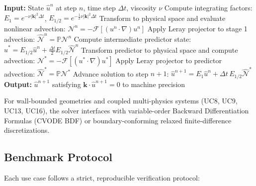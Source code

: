 \begin{algorithm}[H]
\caption{LeanFlow Lawson Integrating Factor RK2 (IF-RK2) Solenoidal Time-Step}
\label{alg:leanflow}
\begin{algorithmic}[1]
\State \textbf{Input:} State $\hat{u}^n$ at step $n$, time step $\Delta t$, viscosity $\nu$
\State Compute integrating factors: $E_1 = e^{-\nu |\mathbf{k}|^2 \Delta t}$, $E_{1/2} = e^{-\frac{1}{2}\nu |\mathbf{k}|^2 \Delta t}$
\State Transform to physical space and evaluate nonlinear advection:
       $\mathcal{N}^n = -\mathcal{F}\left[ (u^n \cdot \nabla) u^n \right]$
\State Apply Leray projector to stage 1 advection: $\hat{\mathcal{N}}^n = \mathbb{P} \mathcal{N}^n$
\State Compute intermediate predictor state:
       $\hat{u}^* = E_{1/2} \hat{u}^n + \frac{\Delta t}{2} E_{1/2} \hat{\mathcal{N}}^n$
\State Transform predictor to physical space and compute advection:
       $\mathcal{N}^* = -\mathcal{F}\left[ (u^* \cdot \nabla) u^* \right]$
\State Apply Leray projector to predictor advection: $\hat{\mathcal{N}}^* = \mathbb{P} \mathcal{N}^*$
\State Advance solution to step $n+1$:
       $\hat{u}^{n+1} = E_1 \hat{u}^n + \Delta t \, E_{1/2} \hat{\mathcal{N}}^*$
\State \textbf{Output:} $\hat{u}^{n+1}$ satisfying $\mathbf{k} \cdot \hat{u}^{n+1} = 0$ to machine precision
\end{algorithmic}
\end{algorithm}

For wall-bounded geometries and coupled multi-physics systems (UC8, UC9, UC13, UC16), the solver interfaces with variable-order Backward Differentiation Formulas (CVODE BDF) or boundary-conforming relaxed finite-difference discretizations.

\subsection{Benchmark Protocol}

Each use case follows a strict, reproducible verification protocol:

